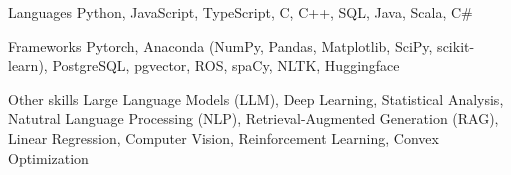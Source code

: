 
\begin{cvskills}
  \cvskill
    {Languages} %
    {Python, JavaScript, TypeScript, C, C++, SQL, Java, Scala, C\#} %

  \cvskill
    {Frameworks} %
    {Pytorch, Anaconda (NumPy, Pandas, Matplotlib, SciPy, scikit-learn), PostgreSQL, pgvector, ROS, spaCy, NLTK, Huggingface} %

  \cvskill
  {Other skills}
  {Large Language Models (LLM), Deep Learning, Statistical Analysis, Natutral Language Processing (NLP), Retrieval-Augmented Generation (RAG), Linear Regression, Computer Vision, Reinforcement Learning, Convex Optimization}
\end{cvskills}
